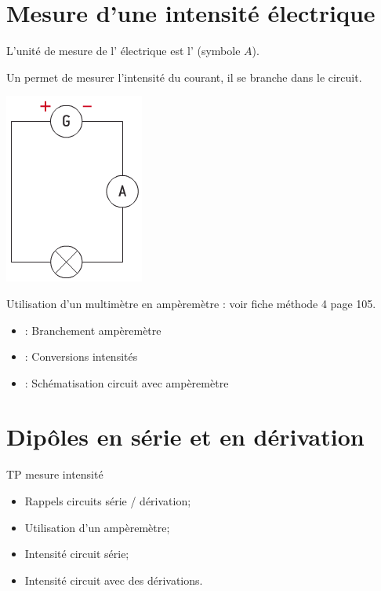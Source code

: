 \documentclass[12pt,a4paper]{article}
\begin{document}
	
	

\section{Mesure d'une intensité électrique}


\begin{mybilan}
	L'unité de mesure de l' électrique est l'  (symbole $A$). 
	
	Un  permet de mesurer l'intensité du courant, il se branche  dans le circuit.
	
	\begin{center}
		\includegraphics[scale=0.6]{img/schema1}
	\end{center}

	Utilisation d'un multimètre en ampèremètre : voir fiche méthode 4 page 105.
\end{mybilan}

\begin{myexos}
	\begin{itemize}
		\item {} : Branchement ampèremètre
		\item {} : Conversions intensités
		\item {} : Schématisation circuit avec ampèremètre
	\end{itemize}%
\end{myexos}




\section{Dipôles en série et en dérivation}

\begin{myact}{TP mesure intensité}
		
	\begin{itemize}
		\item Rappels circuits série / dérivation;
		\item Utilisation d'un ampèremètre;
		\item Intensité circuit série;
		\item Intensité circuit avec des dérivations.
		
	\end{itemize}
\end{myact}
\end{document}
